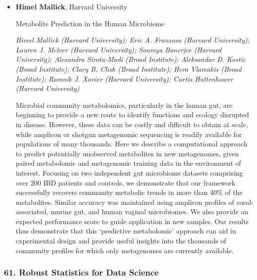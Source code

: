 \begin{itemize}
\item \textbf{Himel Mallick}, Harvard University

Metabolite Prediction in the Human Microbiome

\emph{\footnotesize Himel Mallick (Harvard University); Eric A. Franzosa (Harvard University); Lauren J. Mclver (Harvard University); Soumya Banerjee (Harvard University); Alexandra Sirota-Madi (Broad Institute); Aleksandar D. Kostic (Broad Institute); Clary B. Clish (Broad Institute); Hera Vlamakis (Broad Institute); Ramnik J. Xavier (Harvard University); Curtis Huttenhower (Harvard University)}

Microbial community metabolomics, particularly in the human gut, are beginning to provide a new route to identify functions and ecology disrupted in disease. However, these data can be costly and difficult to obtain at scale, while amplicon or shotgun metagenomic sequencing is readily available for populations of many thousands. Here we describe a computational approach to predict potentially unobserved metabolites in new metagenomes, given paired metabolomic and metagenomic training data in the environment of interest. Focusing on two independent gut microbiome datasets comprising over 200 IBD patients and controls, we demonstrate that our framework successfully recovers community metabolic trends in more than 40\% of the metabolites. Similar accuracy was maintained using amplicon profiles of coral-associated, murine gut, and human vaginal microbiomes. We also provide an expected performance score to guide application in new samples. Our results thus demonstrate that this ‘predictive metabolomic’ approach can aid in experimental design and provide useful insights into the thousands of community profiles for which only metagenomes are currently available.

\end{itemize}

\subsubsection*{61. Robust Statistics for Data Science}

